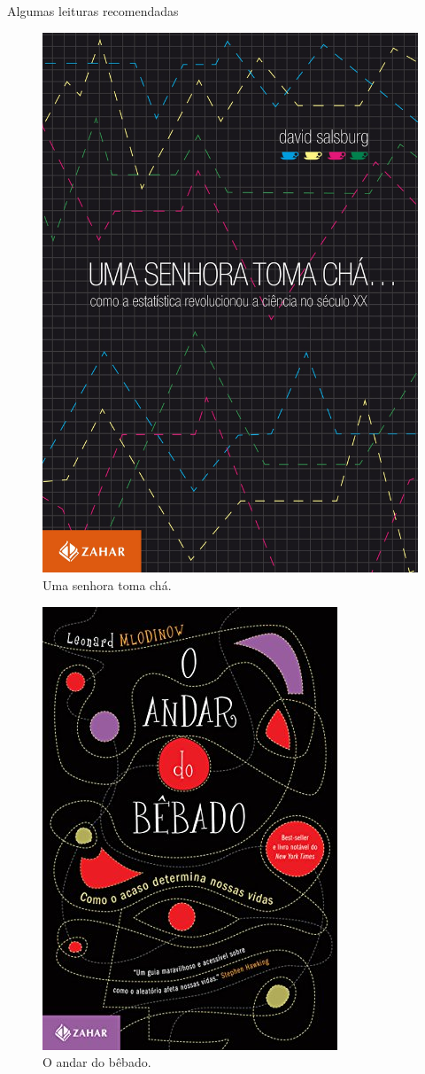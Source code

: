 \documentclass[
  ignorenonframetext,
  serif,
  professionalfont,
  usenames,
  dvipsnames,
  aspectratio = 169]{beamer}
\def\beginAHalfColumn{\begin{minipage}{0.49\textwidth}}%
\def\endColumns{\end{minipage}}%
\begin{document}
\begin{frame}{Algumas leituras recomendadas}
\protect\hypertarget{algumas-leituras-recomendadas}{}
\beginAHalfColumn

\begin{figure}

{\centering \includegraphics[width=0.5\linewidth]{./img/cha} 

}

\caption{Uma senhora toma chá.}\label{fig:unnamed-chunk-13}
\end{figure}

\endColumns
\beginAHalfColumn

\begin{figure}

{\centering \includegraphics[width=0.5\linewidth]{./img/bebado} 

}

\caption{O andar do bêbado.}\label{fig:unnamed-chunk-14}
\end{figure}

\endColumns
\end{frame}
\end{document}
